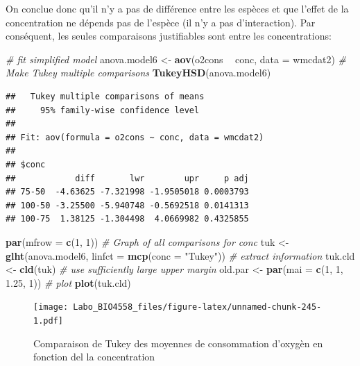 \documentclass[12pt,]{book}
\newenvironment{Shaded}{\begin{snugshade}}{\end{snugshade}}
\newcommand{\CommentTok}[1]{\textcolor[rgb]{0.56,0.35,0.01}{\textit{#1}}}
\newcommand{\DataTypeTok}[1]{\textcolor[rgb]{0.13,0.29,0.53}{#1}}
\newcommand{\DecValTok}[1]{\textcolor[rgb]{0.00,0.00,0.81}{#1}}
\newcommand{\FloatTok}[1]{\textcolor[rgb]{0.00,0.00,0.81}{#1}}
\newcommand{\KeywordTok}[1]{\textcolor[rgb]{0.13,0.29,0.53}{\textbf{#1}}}
\newcommand{\NormalTok}[1]{#1}
\newcommand{\OperatorTok}[1]{\textcolor[rgb]{0.81,0.36,0.00}{\textbf{#1}}}
\newcommand{\StringTok}[1]{\textcolor[rgb]{0.31,0.60,0.02}{#1}}
\begin{document}
On conclue donc qu'il n'y a pas de différence entre les espèces et que l'effet de la concentration ne dépends pas de l'espèce (il n'y a pas d'interaction). Par conséquent, les seules comparaisons justifiables sont entre les concentrations:

\begin{Shaded}
\begin{Highlighting}[]
\CommentTok{# fit simplified model}
\NormalTok{anova.model6 <-}\StringTok{ }\KeywordTok{aov}\NormalTok{(o2cons }\OperatorTok{~}\StringTok{ }\NormalTok{conc, }\DataTypeTok{data =}\NormalTok{ wmcdat2)}
\CommentTok{# Make Tukey multiple comparisons}
\KeywordTok{TukeyHSD}\NormalTok{(anova.model6)}
\end{Highlighting}
\end{Shaded}

\begin{verbatim}
##   Tukey multiple comparisons of means
##     95% family-wise confidence level
## 
## Fit: aov(formula = o2cons ~ conc, data = wmcdat2)
## 
## $conc
##            diff       lwr        upr     p adj
## 75-50  -4.63625 -7.321998 -1.9505018 0.0003793
## 100-50 -3.25500 -5.940748 -0.5692518 0.0141313
## 100-75  1.38125 -1.304498  4.0669982 0.4325855
\end{verbatim}

\begin{Shaded}
\begin{Highlighting}[]
\KeywordTok{par}\NormalTok{(}\DataTypeTok{mfrow =} \KeywordTok{c}\NormalTok{(}\DecValTok{1}\NormalTok{, }\DecValTok{1}\NormalTok{))}
\CommentTok{# Graph of all comparisons for conc}
\NormalTok{tuk <-}\StringTok{ }\KeywordTok{glht}\NormalTok{(anova.model6, }\DataTypeTok{linfct =} \KeywordTok{mcp}\NormalTok{(}\DataTypeTok{conc =} \StringTok{"Tukey"}\NormalTok{))}
\CommentTok{# extract information}
\NormalTok{tuk.cld <-}\StringTok{ }\KeywordTok{cld}\NormalTok{(tuk)}
\CommentTok{# use sufficiently large upper margin}
\NormalTok{old.par <-}\StringTok{ }\KeywordTok{par}\NormalTok{(}\DataTypeTok{mai =} \KeywordTok{c}\NormalTok{(}\DecValTok{1}\NormalTok{, }\DecValTok{1}\NormalTok{, }\FloatTok{1.25}\NormalTok{, }\DecValTok{1}\NormalTok{))}
\CommentTok{# plot}
\KeywordTok{plot}\NormalTok{(tuk.cld)}
\end{Highlighting}
\end{Shaded}

\begin{figure}
\centering
\texttt{[image: Labo\_BIO4558\_files/figure-latex/unnamed-chunk-245-1.pdf]}
\caption{\label{fig:unnamed-chunk-245}Comparaison de Tukey des moyennes de consommation d'oxygèn en fonction del la concentration}
\end{figure}
\end{document}
